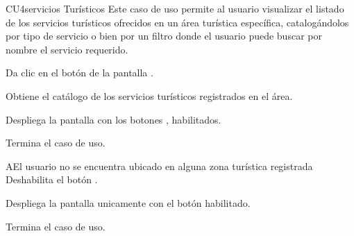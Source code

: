 
% 



	\begin{UseCase}{CU4}{servicios Turísticos}{
		Este caso de uso permite al usuario visualizar el listado de los servicios turísticos ofrecidos en un área turística específica, catalogándolos por tipo de servicio o bien por un filtro donde el usuario puede buscar por nombre el servicio requerido. 
	}
	\end{UseCase}
	\begin{UCtrayectoria} 
		\UCpaso[\UCactor] Da clic en el botón  de la pantalla .
		
		\UCpaso Obtiene el catálogo de los servicios turísticos registrados en el área.
		
		\UCpaso Despliega la pantalla  con los botones ,  habilitados.

		\UCpaso[] Termina el caso de uso.
		
	\end{UCtrayectoria}

		\begin{UCtrayectoriaA}{A}{El usuario no se encuentra ubicado en alguna zona turística registrada}
		\UCpaso Deshabilita el botón .
		
		\UCpaso Despliega la pantalla  unicamente con el botón  habilitado.
		
		\UCpaso[] Termina el caso de uso.
		
	\end{UCtrayectoriaA}
	
	